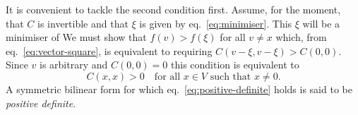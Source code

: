 \documentclass[10pt, a4paper]{article}
\begin{document}
It is convenient to tackle the second condition first. Assume, for the
moment, that $C$ is invertible and that $\xi$ is given by
eq.~\eqref{eq:minimiser}. This $\xi$ will be a minimiser of We must show that $f(v)>f(\xi)$ for all
$v\neq x$ which, from eq.~\eqref{eq:vector-square}, is equivalent to
requiring $C(v-\xi,v-\xi)>C(0,0)$. Since $v$ is arbitrary and
$C(0,0)=0$ this condition is equivalent to
\begin{equation}
  \label{eq:positive-definite}
  C(x,x) > 0 \quad\text{for all $x\in V$ such that $x\neq0$}.
\end{equation}
A symmetric bilinear form for which eq.~\eqref{eq:positive-definite}
holds is said to be \emph{positive definite}. 
\end{document}
